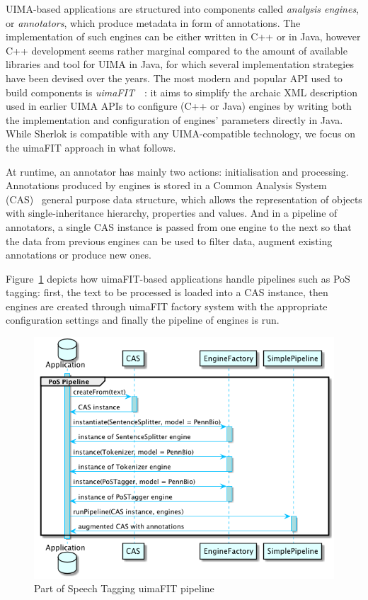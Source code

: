 \documentclass{article}
\begin{document}
UIMA-based applications are structured into components called \emph{analysis engines}, or
\emph{annotators}, which produce metadata in form of annotations. The implementation of such engines
can be either written in C++ or in Java, however C++ development seems rather marginal compared to
the amount of available libraries and tool for UIMA in Java, for which several implementation
strategies have been devised over the years. The most modern and popular API used to build
components is \emph{uimaFIT}~\cite{uimafit}~\cite{uimafit_2009}: it aims to simplify the archaic XML
description used in earlier UIMA APIs to configure (C++ or Java) engines by writing both the
implementation and configuration of engines' parameters directly in Java. While Sherlok is
compatible with any UIMA-compatible technology, we focus on the uimaFIT approach in what follows.

At runtime, an annotator has mainly two actions: initialisation and processing. Annotations produced
by engines is stored in a Common Analysis System (CAS)~\cite{cas} general purpose data structure,
which allows the representation of objects with single-inheritance hierarchy, properties and values.
And in a pipeline of annotators, a single CAS instance is passed from one engine to the next so that
the data from previous engines can be used to filter data, augment existing annotations or produce
new ones.

Figure~\ref{fig:pos_pipeline_uimafit} depicts how uimaFIT-based applications handle pipelines such
as PoS tagging: first, the text to be processed is loaded into a CAS instance, then engines are
created through uimaFIT factory system with the appropriate configuration settings and finally the
pipeline of engines is run.

\begin{figure}[h]
    \centering
    \includegraphics[width=0.9\linewidth]{res/uimafit.png}
    \caption{Part of Speech Tagging uimaFIT pipeline}
    \label{fig:pos_pipeline_uimafit}
\end{figure}
\end{document}
